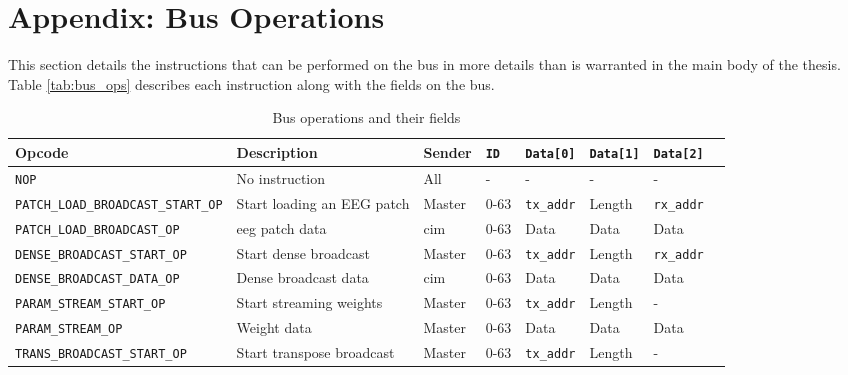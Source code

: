 \appendix
\section{Appendix: Bus Operations}
\label{app:bus_ops}
This section details the instructions that can be performed on the bus in more details than is warranted in the main body of the thesis. Table \ref{tab:bus_ops} describes
each instruction along with the fields on the bus.

\begin{sidewaystable}
    \centering
    \renewcommand{\arraystretch}{1.2} %
    \setlength{\arrayrulewidth}{1.5pt} %
    \caption{Bus operations and their fields}
    \begin{tabular}{@{} p{6.5cm}lllllll @{}}
        \toprule
        Opcode                                      & Description                       & Sender        & \texttt{ID}   & \texttt{Data[0]}  & \texttt{Data[1]}  & \texttt{Data[2]} \\\midrule
        \texttt{NOP}                                & No instruction                    & All           & -             & -                 & -                 & - \\
        \texttt{PATCH\_LOAD\_BROADCAST\_START\_OP}  & Start loading an EEG patch        & Master        & 0-63          & \texttt{tx\_addr} & Length            & \texttt{rx\_addr} \\
        \texttt{PATCH\_LOAD\_BROADCAST\_OP}         & \ac{eeg} patch data               & \ac{cim}      & 0-63          & Data              & Data              & Data \\
        \texttt{DENSE\_BROADCAST\_START\_OP}        & Start dense broadcast             & Master        & 0-63          & \texttt{tx\_addr} & Length            & \texttt{rx\_addr} \\
        \texttt{DENSE\_BROADCAST\_DATA\_OP}         & Dense broadcast data              & \ac{cim}      & 0-63          & Data              & Data              & Data \\
        \texttt{PARAM\_STREAM\_START\_OP}           & Start streaming weights           & Master        & 0-63          & \texttt{tx\_addr} & Length            & - \\
        \texttt{PARAM\_STREAM\_OP}                  & Weight data                       & Master        & 0-63          & Data              & Data              & Data \\
        \texttt{TRANS\_BROADCAST\_START\_OP}        & Start transpose broadcast         & Master        & 0-63          & \texttt{tx\_addr} & Length            & - \\

\end{tabular}
\end{sidewaystable}
